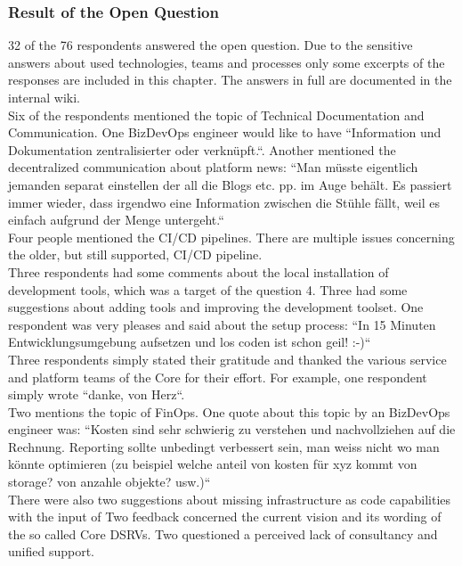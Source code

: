 \documentclass[a4paper,12pt]{article}
\begin{document}
    \subsubsection{Result of the Open Question}
    \label{sssec:ropque}
    32 of the 76 respondents answered the open question.
    Due to the sensitive answers about used technologies, teams and processes only some excerpts of the responses are included in this chapter.
    The answers in full are documented in the internal wiki\cite{sbbdevopsexperience}.\\
    Six of the respondents mentioned the topic of Technical Documentation and Communication.
    One BizDevOps engineer would like to have ``Information und Dokumentation zentralisierter oder verknüpft.``.
    Another mentioned the decentralized communication about platform news: ``Man müsste eigentlich jemanden separat einstellen
    der all die Blogs etc. pp. im Auge behält. Es passiert immer wieder, dass irgendwo eine Information zwischen die
    Stühle fällt, weil es einfach aufgrund der Menge untergeht.``\\
    Four people mentioned the CI/CD pipelines.
    There are multiple issues concerning the older, but still supported, CI/CD pipeline.\\
    Three respondents had some comments about the local installation of development tools, which was
    a target of the question 4.
    Three had some suggestions about adding tools and improving the development toolset.
    One respondent was very pleases and said about the setup process: ``In 15 Minuten Entwicklungsumgebung aufsetzen und los coden ist schon geil! :-)``\\
    Three respondents simply stated their gratitude and thanked the various service and platform teams of the Core for their effort.
    For example, one respondent simply wrote ``danke, von Herz``.\\
    Two mentions the topic of FinOps.
    One quote about this topic by an BizDevOps engineer was: ``Kosten sind sehr schwierig zu verstehen und nachvollziehen auf die Rechnung. Reporting
    sollte unbedingt verbessert sein, man weiss nicht wo man könnte optimieren (zu beispiel welche anteil von kosten für
    xyz kommt von storage? von anzahle objekte? usw.)``\\
    There were also two suggestions about missing infrastructure as code capabilities with the input of
    Two feedback concerned the current vision and its wording of the so called Core DSRVs.
    Two questioned a perceived lack of consultancy and unified support.
\end{document}
